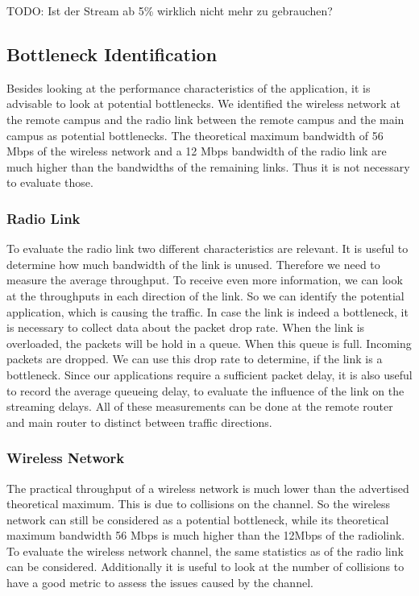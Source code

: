 \documentclass[
10pt, %
a4paper, %
oneside, %
headinclude,footinclude, %
BCOR5mm, %
]{scrartcl}
\begin{document}
TODO: Ist der Stream ab 5\% wirklich nicht mehr zu gebrauchen?
\subsection{Bottleneck Identification}
Besides looking at the performance characteristics of the application, it is advisable to look at potential bottlenecks. We identified the wireless network at the remote campus and the radio link between the remote campus and the main campus as potential bottlenecks. The theoretical maximum bandwidth of 56 Mbps of the wireless network and a 12 Mbps bandwidth of the radio link are much higher than the bandwidths of the remaining links. Thus it is not necessary to evaluate those.

\subsubsection{Radio Link}
To evaluate the radio link two different characteristics are relevant. It is useful to determine how much bandwidth of the link is unused. Therefore we need to measure the average throughput. To receive even more information, we can look at the throughputs in each direction of the link. So we can identify the potential application, which is causing the traffic. 
In case the link is indeed a bottleneck, it is necessary to collect data about the packet drop rate. When the link is overloaded, the packets will be hold in a queue. When this queue is full. Incoming packets are dropped. We can use this drop rate to determine, if the link is a bottleneck.
Since our applications require a sufficient packet delay, it is also useful to record the average queueing delay, to evaluate the influence of the link on the streaming delays.
All of these measurements can be done at the remote router and main router to distinct between traffic directions.

\subsubsection{Wireless Network}
The practical throughput of a wireless network is much lower than the advertised theoretical maximum. This is due to collisions on the channel. So the wireless network can still be considered as a potential bottleneck, while its theoretical maximum bandwidth 56 Mbps is much higher than the 12Mbps of the radiolink. To evaluate the wireless network channel, the same statistics as of the radio link can be considered. 
Additionally it is useful to look at the number of collisions to have a good metric to assess the issues caused by the channel.
\end{document}
